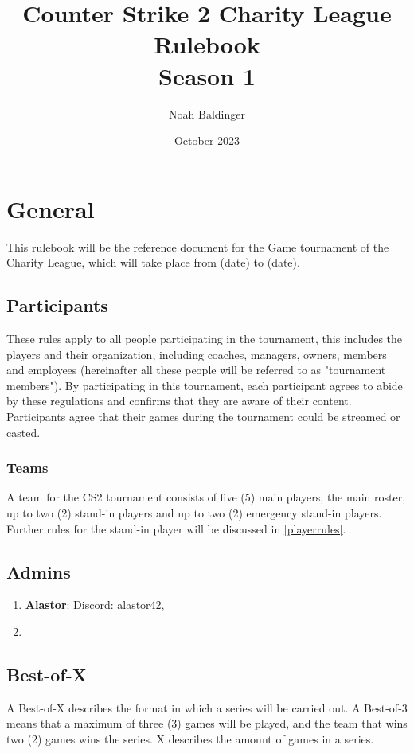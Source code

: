\documentclass{article}
\title{Counter Strike 2 Charity League Rulebook\\ Season 1}
\author{Noah Baldinger}
\date{October 2023}
\begin{document}
\maketitle

\section{General}

This rulebook will be the reference document for the Game tournament of the Charity League, which will take place from (date) to (date). 

\subsection{Participants}
These rules apply to all people participating in the tournament, this 
includes the players and their organization, including coaches, managers, owners, members and employees (hereinafter all these people 
will be referred to as "tournament members"). By participating in this tournament, each participant agrees to abide by these regulations and confirms that they are aware of their content.\\
Participants agree that their games during the tournament could be streamed or casted.


\subsubsection{Teams}
A team for the CS2 tournament consists of five (5) main players, the main roster, up to two (2) stand-in players and up to two (2) 
emergency stand-in players. Further rules for the stand-in player will be discussed in \ref{playerrules}.


\subsection{Admins}

\begin{enumerate}
    \item \textbf{Alastor}: Discord: alastor42,
    \item \textbf{}
\end{enumerate}

\subsection{Best-of-X}
A Best-of-X describes the format in which a series will be carried out. A Best-of-3 means that a maximum of three (3) games will be 
played, and the team that wins two (2) games wins the series. X describes the amount of games in a series.
\end{document}
